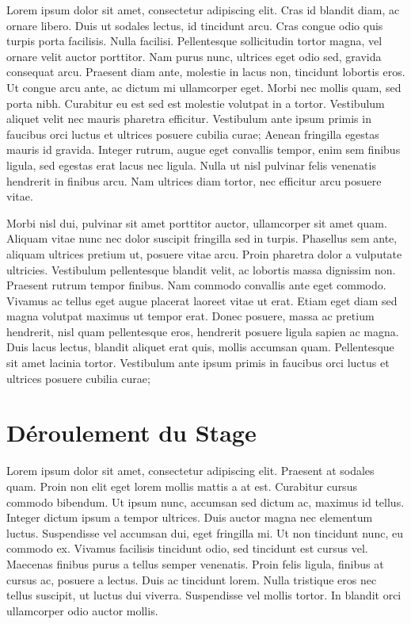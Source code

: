 \documentclass{report}
\begin{document}
Lorem ipsum dolor sit amet, consectetur adipiscing elit. Cras id blandit diam, ac ornare libero. Duis ut sodales lectus, id tincidunt arcu. Cras congue odio quis turpis porta facilisis. Nulla facilisi. Pellentesque sollicitudin tortor magna, vel ornare velit auctor porttitor. Nam purus nunc, ultrices eget odio sed, gravida consequat arcu. Praesent diam ante, molestie in lacus non, tincidunt lobortis eros. Ut congue arcu ante, ac dictum mi ullamcorper eget. Morbi nec mollis quam, sed porta nibh. Curabitur eu est sed est molestie volutpat in a tortor. Vestibulum aliquet velit nec mauris pharetra efficitur. Vestibulum ante ipsum primis in faucibus orci luctus et ultrices posuere cubilia curae; Aenean fringilla egestas mauris id gravida. Integer rutrum, augue eget convallis tempor, enim sem finibus ligula, sed egestas erat lacus nec ligula. Nulla ut nisl pulvinar felis venenatis hendrerit in finibus arcu. Nam ultrices diam tortor, nec efficitur arcu posuere vitae.

Morbi nisl dui, pulvinar sit amet porttitor auctor, ullamcorper sit amet quam. Aliquam vitae nunc nec dolor suscipit fringilla sed in turpis. Phasellus sem ante, aliquam ultrices pretium ut, posuere vitae arcu. Proin pharetra dolor a vulputate ultricies. Vestibulum pellentesque blandit velit, ac lobortis massa dignissim non. Praesent rutrum tempor finibus. Nam commodo convallis ante eget commodo. Vivamus ac tellus eget augue placerat laoreet vitae ut erat. Etiam eget diam sed magna volutpat maximus ut tempor erat. Donec posuere, massa ac pretium hendrerit, nisl quam pellentesque eros, hendrerit posuere ligula sapien ac magna. Duis lacus lectus, blandit aliquet erat quis, mollis accumsan quam. Pellentesque sit amet lacinia tortor. Vestibulum ante ipsum primis in faucibus orci luctus et ultrices posuere cubilia curae;

\chapter{Déroulement du Stage}
Lorem ipsum dolor sit amet, consectetur adipiscing elit. Praesent at sodales quam. Proin non elit eget lorem mollis mattis a at est. Curabitur cursus commodo bibendum. Ut ipsum nunc, accumsan sed dictum ac, maximus id tellus. Integer dictum ipsum a tempor ultrices. Duis auctor magna nec elementum luctus. Suspendisse vel accumsan dui, eget fringilla mi. Ut non tincidunt nunc, eu commodo ex. Vivamus facilisis tincidunt odio, sed tincidunt est cursus vel. Maecenas finibus purus a tellus semper venenatis. Proin felis ligula, finibus at cursus ac, posuere a lectus. Duis ac tincidunt lorem. Nulla tristique eros nec tellus suscipit, ut luctus dui viverra. Suspendisse vel mollis tortor. In blandit orci ullamcorper odio auctor mollis.
\end{document}
